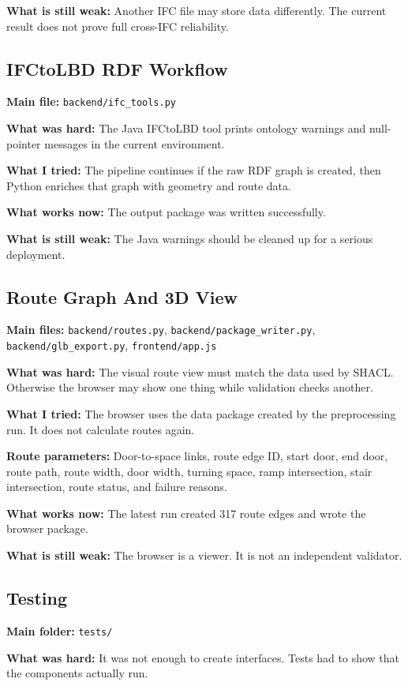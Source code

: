 \documentclass[11pt,a4paper]{article}
\begin{document}
\textbf{What is still weak:}
Another IFC file may store data differently. The current result does not prove full cross-IFC reliability.

\subsection{IFCtoLBD RDF Workflow}
\textbf{Main file:} \texttt{backend/ifc\_tools.py}

\textbf{What was hard:}
The Java IFCtoLBD tool prints ontology warnings and null-pointer messages in the current environment.

\textbf{What I tried:}
The pipeline continues if the raw RDF graph is created, then Python enriches that graph with geometry and route data.

\textbf{What works now:}
The output package was written successfully.

\textbf{What is still weak:}
The Java warnings should be cleaned up for a serious deployment.

\subsection{Route Graph And 3D View}
\textbf{Main files:} \texttt{backend/routes.py}, \texttt{backend/package\_writer.py}, \texttt{backend/glb\_export.py}, \texttt{frontend/app.js}

\textbf{What was hard:}
The visual route view must match the data used by SHACL. Otherwise the browser may show one thing while validation checks another.

\textbf{What I tried:}
The browser uses the data package created by the preprocessing run. It does not calculate routes again.

\textbf{Route parameters:}
Door-to-space links, route edge ID, start door, end door, route path, route width, door width, turning space, ramp intersection, stair intersection, route status, and failure reasons.

\textbf{What works now:}
The latest run created 317 route edges and wrote the browser package.

\textbf{What is still weak:}
The browser is a viewer. It is not an independent validator.

\subsection{Testing}
\textbf{Main folder:} \texttt{tests/}

\textbf{What was hard:}
It was not enough to create interfaces. Tests had to show that the components actually run.
\end{document}
